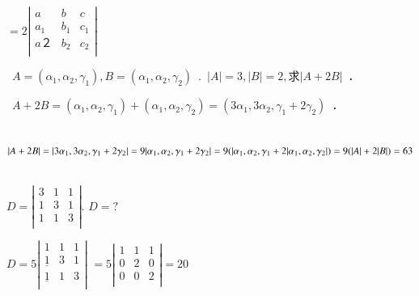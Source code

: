 \documentclass[printbox]{BHCexam}
\begin{document}
\begin{questions}
\begin{solution}
$=2\left|
\begin{array}{ccc}
  a & b & c \\  %
  a_1& b_1 & c_1\\  %
  a２ & b_2  & c_2\\  %
\end{array}\right|$
\end{solution}





\question \text{\bf{[例3]}}~$A=(\alpha_1,\alpha_2,\gamma_1),B=(\alpha_1,\alpha_2,\gamma_2)
$~.~$|A|=3,|B|=2,求|A+2B|$~．

\begin{solution}
  ~$A+2B=(\alpha_1,\alpha_2,\gamma_1)+(\alpha_1,\alpha_2,\gamma_2)=
  (3\alpha_1,3\alpha_2,\gamma_1+2\gamma_2)$~．

  ~$|A+2B|=|3\alpha_1,3\alpha_2,\gamma_1+2\gamma_2|=9|\alpha_1,\alpha_2,\gamma_1+2\gamma_2|\\
  =9(|\alpha_1,\alpha_2,\gamma_1+ 2|\alpha_1,\alpha_2,\gamma_2|)\\
  =9(|A|+2|B|)=63
  $~
\end{solution}

\question \text{\bf{[例4]}} $D=\left|
\begin{array}{ccc}
  3&1&1\\
  1&3&1\\
  1&1&3\\
\end{array}\right|$.
$D=?$
\end{questions}
\begin{solution}
  $D=5\left|
\begin{array}{ccc}
  1&1&1\\
  \underline{1}&3&1\\
  \underline{1}&1&3\\
\end{array}\right|$
$=5\left|
\begin{array}{ccc}
  1&1&1\\
  0&2&0\\
  0&0&2\\
\end{array}\right|=20$
\end{solution}
\end{document}
